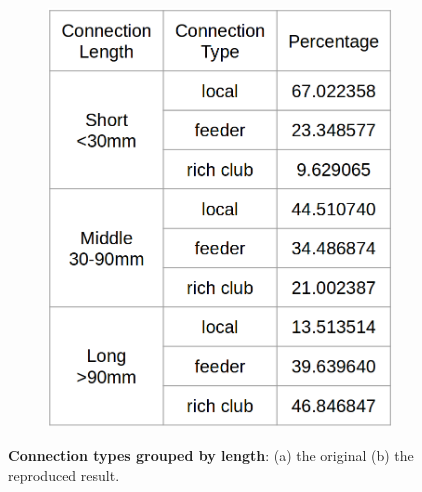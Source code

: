 \documentclass{article}
\begin{document}
\begin{figure}[!htp]
{\begin{subfigure}[b]{0.4\textwidth}
            \includegraphics[width=\textwidth]{table2}
            \caption{}
            \label{fig:table2}
        \end{subfigure}
    }
    \caption{\textbf{Connection types grouped by length}: (a) the original (b) the reproduced result.}
    \label{fig:fig2-1}
\end{figure}
\end{document}
